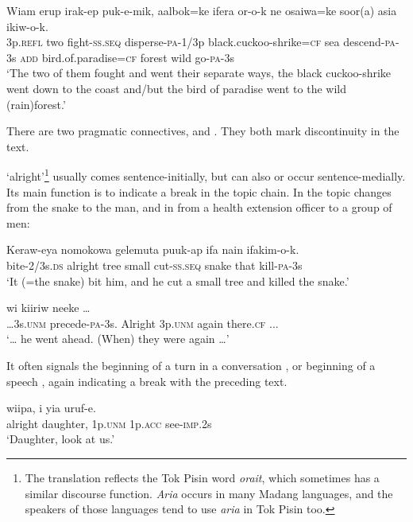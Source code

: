 \ea%
\label{ex:3:x1361}
\gll Wiam erup irak-ep puk-e-mik, aalbok=ke ifera or-o-k ne osaiwa=ke soor(a) asia ikiw-o-k.\\
3p.\textsc{refl} two fight-\textsc{ss}.\textsc{seq} disperse-\textsc{pa}-1/3p black.cuckoo-shrike=\textsc{cf} sea descend-\textsc{pa}-3s \textsc{add} bird.of.paradise=\textsc{cf} forest wild go-\textsc{pa}-3s\\
\glt`The two of them fought and went their separate ways, the black cuckoo-shrike went down to the coast and/but the bird of paradise went to the wild (rain)forest.'
\z

There are two  pragmatic connectives,  and . They both mark discontinuity in the text.

 `alright'\footnote{The translation reflects the Tok Pisin word \textit{orait}, which sometimes has a similar discourse function. \textit{Aria} occurs in many Madang languages, and the speakers of those languages tend to use \textit{aria} in Tok Pisin too.} usually comes sentence-initially, but can also or occur sentence-med\-ially. Its main function is to indicate a break in the topic chain. In  the topic changes from the snake to the man, and in  from a health extension officer to a group of men:

\ea%
\label{ex:3:x717}
\gll Keraw-eya  nomokowa gelemuta puuk-ap ifa nain ifakim-o-k.\\
bite-2/3s.\textsc{ds} alright tree small cut-\textsc{ss}.\textsc{seq} snake that kill-\textsc{pa}-3s\\
\glt`It (=the snake) bit him, and he cut a small tree and killed the snake.'
\z

\ea%
\label{ex:3:x718}
  wi kiiriw neeke {\dots} \\
{\dots}3s.\textsc{unm} precede-\textsc{pa}-3s. Alright 3p.\textsc{unm} again there.\textsc{cf} ...\\
\glt`{\dots} he went ahead. (When) they were  again {\dots}'
\z

It often signals the beginning of a turn in a conversation , or beginning of a speech , again indicating a break with the preceding text. 

\ea%
\label{ex:3:x721}
\gll {} wiipa, i yia uruf-e. \\
alright daughter, 1p.\textsc{unm} 1p.\textsc{acc} see-\textsc{imp}.2s\\
\glt`Daughter, look at us.'
\z


